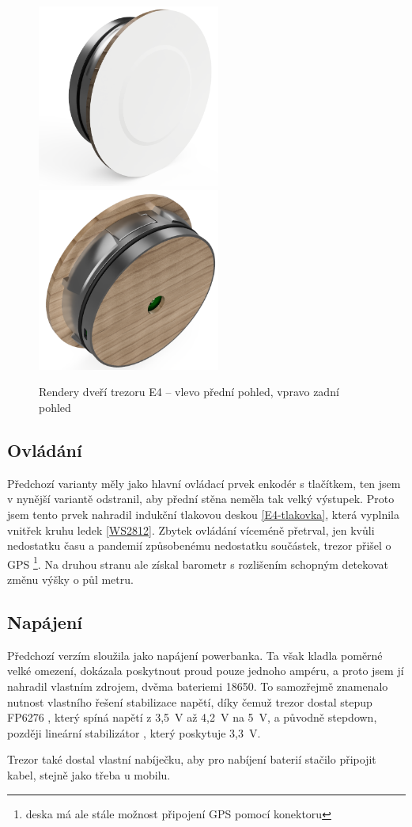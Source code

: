 \begin{figure}[htbp]
    \centering
    \includegraphics[width=170pt]{kapitoly/obrazky/E4/predni_render.png}
    \includegraphics[width=170pt]{kapitoly/obrazky/E4/zadni_render.png}
    \caption{Rendery dveří trezoru E4 -- vlevo přední pohled, vpravo zadní pohled \centering}
    \label{fig:E4-render}
\end{figure}

\subsection{Ovládání}
Předchozí varianty měly jako hlavní ovládací prvek enkodér s tlačítkem, ten jsem v nynější variantě odstranil, aby přední stěna neměla tak velký 
výstupek. Proto jsem tento prvek nahradil indukční tlakovou deskou \ref{E4-tlakovka}, která vyplnila vnitřek kruhu ledek \ref{WS2812}. 
Zbytek ovládání víceméně přetrval, jen kvůli nedostatku času a pandemií způsobenému nedostatku součástek, trezor přišel o GPS 
\footnote{deska má ale stále možnost připojení GPS pomocí konektoru}.
Na druhou stranu ale získal barometr s rozlišením schopným detekovat změnu výšky o půl metru.

\subsection{Napájení}
Předchozí verzím sloužila jako napájení powerbanka. Ta však kladla poměrné velké omezení, dokázala poskytnout proud pouze jednoho ampéru, a proto 
jsem jí nahradil vlastním zdrojem, dvěma bateriemi 18650. 
To samozřejmě znamenalo nutnost vlastního řešení stabilizace napětí, díky čemuž trezor dostal stepup FP6276 \parencite{fp6276a} , 
který spíná napětí z 3,5~V až 4,2~V na 5~V, a původně stepdown, později lineární stabilizátor , který poskytuje 3,3~V. 

Trezor také dostal vlastní nabíječku, aby pro nabíjení baterií stačilo připojit kabel, stejně jako třeba u mobilu.